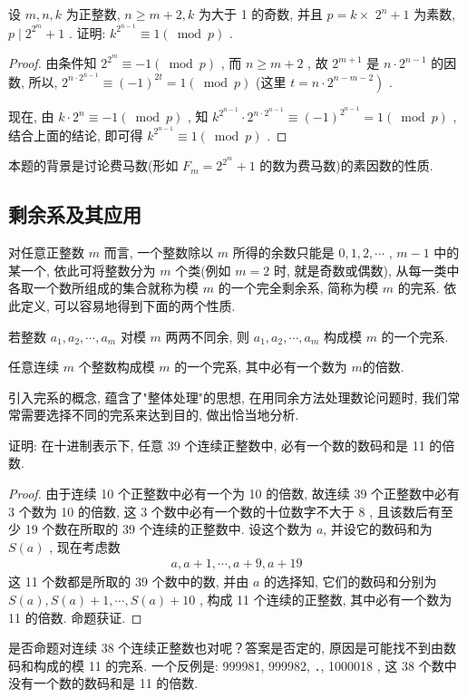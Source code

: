 \begin{example}
	设 $m ,  n ,  k$ 为正整数,  $n \geqslant m+2, k$ 为大于 1 的奇数, 并且 $p=k \times$ $2^{n}+1$ 为素数,  $p \mid 2^{2^{m}}+1$ . 证明:  $k^{2^{n-1}} \equiv 1(\bmod p)$ .
\end{example}
\begin{proof}
	由条件知 $2^{2^{m}} \equiv-1(\bmod p)$ , 而 $n \geqslant m+2$ , 故 $2^{m+1}$ 是 $n \cdot 2^{n-1}$ 的因数, 所以,  $2^{n \cdot 2^{n-1}} \equiv(-1)^{2 t}=1(\bmod p)$ (这里 $\left.t=n \cdot 2^{n-m-2}\right)$ .

	现在, 由 $k \cdot 2^{n} \equiv-1(\bmod p)$ , 知 $k^{2^{n-1}} \cdot 2^{n \cdot 2^{n-1}} \equiv(-1)^{2^{n-1}}=1(\bmod p)$ , 结合上面的结论, 即可得 $k^{2^{n-1}} \equiv 1(\bmod p)$ .
\end{proof}
\begin{note}
	本题的背景是讨论费马数(形如 $F_{m}=2^{2^{m}}+1$ 的数为费马数)的素因数的性质.
\end{note}


\subsection{剩余系及其应用}
对任意正整数 $m$ 而言, 一个整数除以 $m$ 所得的余数只能是 $0,1,2, \cdots$ ,  $m-1$ 中的某一个, 依此可将整数分为 $m$ 个类(例如 $m=2$ 时, 就是奇数或偶数), 从每一类中各取一个数所组成的集合就称为模 $m$ 的一个完全剩余系, 简称为模 $m$ 的完系. 依此定义, 可以容易地得到下面的两个性质.

\begin{property}
	若整数 $a_{1}, a_{2}, \cdots, a_{m}$ 对模 $m$ 两两不同余, 则 $a_{1}, a_{2}, \cdots, a_{m}$ 构成模 $m$ 的一个完系.
\end{property}

\begin{property}
	任意连续 $m$ 个整数构成模 $m$ 的一个完系, 其中必有一个数为 $m$的倍数.
\end{property}

引入完系的概念, 蕴含了"整体处理"的思想, 在用同余方法处理数论问题时, 我们常常需要选择不同的完系来达到目的, 做出恰当地分析.

\begin{example}
	证明: 在十进制表示下, 任意 39 个连续正整数中, 必有一个数的数码和是 11 的倍数.
\end{example}
\begin{proof}
	由于连续 10 个正整数中必有一个为 10 的倍数, 故连续 39 个正整数中必有 3 个数为 10 的倍数, 这 3 个数中必有一个数的十位数字不大于 8 , 且该数后有至少 19 个数在所取的 39 个连续的正整数中. 设这个数为 $a$, 并设它的数码和为 $S(a)$ , 现在考虑数
	\begin{align*}
		a, a+1, \cdots, a+9, a+19
	\end{align*}
	这 11 个数都是所取的 39 个数中的数, 并由 $a$ 的选择知, 它们的数码和分别为 $S(a), S(a)+1, \cdots, S(a)+10$ , 构成 11 个连续的正整数, 其中必有一个数为 11 的倍数. 命题获证.
\end{proof}
\begin{note}
	是否命题对连续 38 个连续正整数也对呢？答案是否定的, 原因是可能找不到由数码和构成的模 11 的完系. 一个反例是: 999981, 999982, ․, 1000018 , 这 38 个数中没有一个数的数码和是 11 的倍数.
\end{note}

